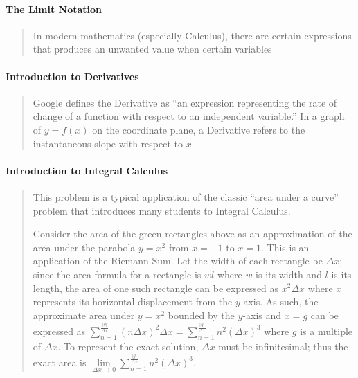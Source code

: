 \documentclass[letterpaper,12pt,twoside]{report}
\begin{document}
	\paragraph{The Limit Notation}
	\begin{quotation}
		In modern mathematics (especially Calculus), there are certain expressions that produces an unwanted value when certain variables 
	\end{quotation}

	\paragraph{Introduction to Derivatives}
	\begin{quotation}
	Google defines the Derivative as ``an expression representing the rate of change of a function with respect to an independent variable.'' In a graph of $y=f(x)$ on the coordinate plane, a Derivative refers to the instantaneous slope with respect to $x$. 
\end{quotation}

	\paragraph{Introduction to Integral Calculus}
	\begin{quotation}
		This problem is a typical application of the classic ``area under a curve'' problem that introduces many students to Integral Calculus.
		
		Consider the area of the {\color{green} green} rectangles above as an approximation of the area under the parabola $y=x^2$ from $x=-1$ to $x=1$. This is an application of the Riemann Sum. Let the width of each rectangle be $\Delta x$; since the area formula for a rectangle is $wl$ where $w$ is its width and $l$ is its length, the area of one such rectangle can be expressed as $x^2\Delta x$ where $x$ represents its horizontal displacement from the $y$-axis. As such, the approximate area under $y=x^2$ bounded by the $y$-axis and $x=g$ can be expressed as $\sum\limits_{n=1}^{\frac{|g|}{\Delta x}}(n\Delta x)^2\Delta x=\sum\limits_{n=1}^{\frac{|g|}{\Delta x}}n^2(\Delta x)^3$ where $g$ is a multiple of $\Delta x$. To represent the exact solution, $\Delta x$ must be infinitesimal; thus the exact area is $\lim\limits_{\Delta x \rightarrow 0}\sum\limits_{n=1}^{\frac{|g|}{\Delta x}}n^2(\Delta x)^3$.
	\end{quotation}
	
\end{document}
